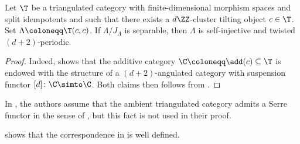 \documentclass[a4paper]{amsart}
\begin{document}
\begin{proposition}
  \label{prop:dZ_CT_twisted_periodic}
  Let $\T$ be a triangulated category with finite-dimensional morphism spaces
  and split idempotents and such that there exists a $d\ZZ$-cluster tilting
  object $c\in\T$. Set $\Lambda\coloneqq\T(c,c)$. If $\Lambda/J_\Lambda$ is
  separable, then $\Lambda$ is self-injective and twisted $(d+2)$-periodic.
\end{proposition}
\begin{proof}
  Indeed,  shows that the additive category
  $\C\coloneqq\add(c)\subseteq\T$ is endowed with the structure of a
  $(d+2)$-angulated category with suspension functor $[d]\colon\C\simto\C$. Both
  claims then follows from .
\end{proof}

\begin{remark}
  In \cite[Prop.~8.5(a)]{CDIM20}, the authors assume that the ambient
  triangulated category admits a Serre functor in the sense of \cite{BK89}, but
  this fact is not used in their proof.
\end{remark}

\begin{remark}
  \label{rmk:ThmA_well_defined}
   shows that the correspondence in
   is well defined.
\end{remark}
\end{document}
